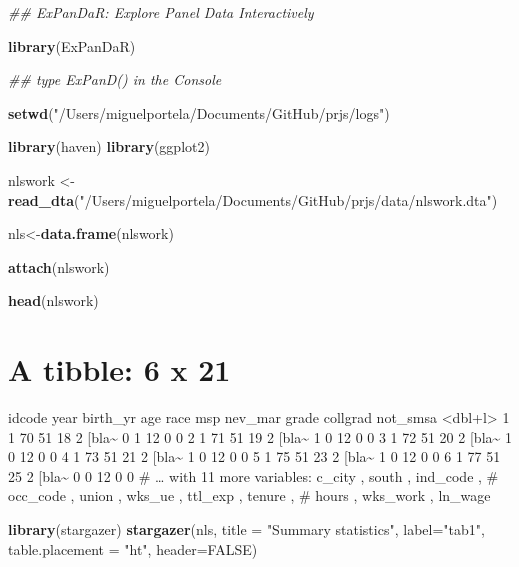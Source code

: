 \documentclass[
  12pt,
]{article}
\newenvironment{Shaded}{\begin{snugshade}}{\end{snugshade}}
\newcommand{\CommentTok}[1]{\textcolor[rgb]{0.56,0.35,0.01}{\textit{#1}}}
\newcommand{\DataTypeTok}[1]{\textcolor[rgb]{0.13,0.29,0.53}{#1}}
\newcommand{\KeywordTok}[1]{\textcolor[rgb]{0.13,0.29,0.53}{\textbf{#1}}}
\newcommand{\NormalTok}[1]{#1}
\newcommand{\OtherTok}[1]{\textcolor[rgb]{0.56,0.35,0.01}{#1}}
\newcommand{\StringTok}[1]{\textcolor[rgb]{0.31,0.60,0.02}{#1}}
\begin{document}
\begin{Shaded}
\begin{Highlighting}[]
\CommentTok{## ExPanDaR: Explore Panel Data Interactively}

  \KeywordTok{library}\NormalTok{(ExPanDaR)}
    
    \CommentTok{## type ExPanD() in the Console}

\KeywordTok{setwd}\NormalTok{(}\StringTok{"/Users/miguelportela/Documents/GitHub/prjs/logs"}\NormalTok{)}

\KeywordTok{library}\NormalTok{(haven)}
\KeywordTok{library}\NormalTok{(ggplot2)}

\NormalTok{nlswork <-}\StringTok{ }\KeywordTok{read_dta}\NormalTok{(}\StringTok{"/Users/miguelportela/Documents/GitHub/prjs/data/nlswork.dta"}\NormalTok{)}

\NormalTok{nls<-}\KeywordTok{data.frame}\NormalTok{(nlswork)}

\KeywordTok{attach}\NormalTok{(nlswork)}

\KeywordTok{head}\NormalTok{(nlswork)}
\end{Highlighting}
\end{Shaded}

\hypertarget{a-tibble-6-x-21}{%
\section{A tibble: 6 x 21}\label{a-tibble-6-x-21}}

idcode year birth\_yr age race msp nev\_mar grade collgrad not\_smsa
\textless dbl+l\textgreater{}
1 1 70 51 18 2 {[}bla\textasciitilde{} 0 1 12 0 0
2 1 71 51 19 2 {[}bla\textasciitilde{} 1 0 12 0 0
3 1 72 51 20 2 {[}bla\textasciitilde{} 1 0 12 0 0
4 1 73 51 21 2 {[}bla\textasciitilde{} 1 0 12 0 0
5 1 75 51 23 2 {[}bla\textasciitilde{} 1 0 12 0 0
6 1 77 51 25 2 {[}bla\textasciitilde{} 0 0 12 0 0
\# \ldots{} with 11 more variables: c\_city , south , ind\_code ,
\# occ\_code , union , wks\_ue , ttl\_exp , tenure ,
\# hours , wks\_work , ln\_wage

\begin{Shaded}
\begin{Highlighting}[]
\KeywordTok{library}\NormalTok{(stargazer)}
\KeywordTok{stargazer}\NormalTok{(nls, }
          \DataTypeTok{title =} \StringTok{"Summary statistics"}\NormalTok{,}
          \DataTypeTok{label=}\StringTok{"tab1"}\NormalTok{, }
          \DataTypeTok{table.placement =} \StringTok{"ht"}\NormalTok{, }
          \DataTypeTok{header=}\OtherTok{FALSE}\NormalTok{)}
\end{Highlighting}
\end{Shaded}
\end{document}
